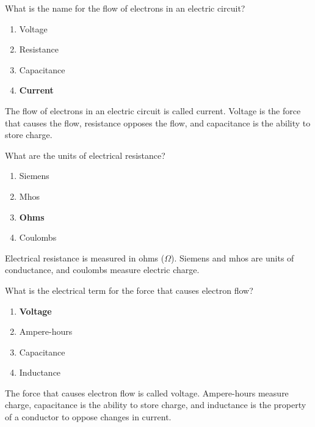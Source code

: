 
\begin{tcolorbox}[colback=gray!10!white,colframe=black!75!black,title={T5A03}]
What is the name for the flow of electrons in an electric circuit?
\begin{enumerate}[label=\Alph*),noitemsep]
    \item Voltage
    \item Resistance
    \item Capacitance
    \item \textbf{Current}
\end{enumerate}
\end{tcolorbox}
The flow of electrons in an electric circuit is called current. Voltage is the force that causes the flow, resistance opposes the flow, and capacitance is the ability to store charge.


\begin{tcolorbox}[colback=gray!10!white,colframe=black!75!black,title={T5A04}]
What are the units of electrical resistance?
\begin{enumerate}[label=\Alph*),noitemsep]
    \item Siemens
    \item Mhos
    \item \textbf{Ohms}
    \item Coulombs
\end{enumerate}
\end{tcolorbox}
Electrical resistance is measured in ohms (\(\Omega\)). Siemens and mhos are units of conductance, and coulombs measure electric charge.


\begin{tcolorbox}[colback=gray!10!white,colframe=black!75!black,title={T5A05}]
What is the electrical term for the force that causes electron flow?
\begin{enumerate}[label=\Alph*),noitemsep]
    \item \textbf{Voltage}
    \item Ampere-hours
    \item Capacitance
    \item Inductance
\end{enumerate}
\end{tcolorbox}
The force that causes electron flow is called voltage. Ampere-hours measure charge, capacitance is the ability to store charge, and inductance is the property of a conductor to oppose changes in current.

